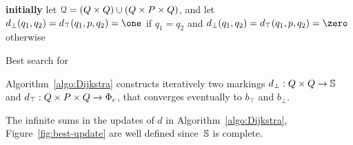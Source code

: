 

\begin{algorithm}

\textbf{initially} let $\mathcal{Q} = (Q \times Q) \cup (Q \times P \times Q)$, 
and let $d_\bot(q_1, q_2) = d_\top(q_1, p, q_2) = \one$
if $q_1 = q_2$ and $d_\bot(q_1, q_2) = d_\top(q_1, p, q_2) = \zero$ otherwise$\;$

\smallskip\noindent
{}
\caption{Best search for \SWVPA}
\label{algo:Dijkstra}
\end{algorithm}

Algorithm~\ref{algo:Dijkstra}
constructs iteratively two markings
$d_\bot : Q \times Q \to \mathbb{S}$ and
$d_\top : Q \times P \times Q \to \Phic$,
that converges eventually to $b_\top$ and $b_\bot$.


\noindent
The infinite sums in the updates of $d$ in Algorithm~\ref{algo:Dijkstra},
Figure~\ref{fig:best-update}
are well defined
since~$\mathbb{S}$ is complete.

